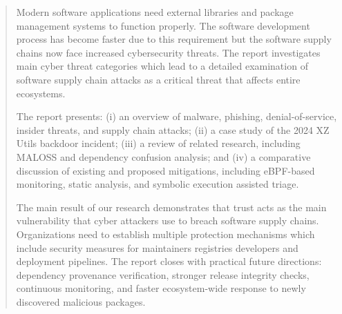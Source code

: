 \begin{abstract}
\addchaptertocentry{\abstractname}

Modern software applications need external libraries and package management systems to function properly. The software development process has become faster due to this requirement but the software supply chains now face increased cybersecurity threats. The report investigates main cyber threat categories which lead to a detailed examination of software supply chain attacks as a critical threat that affects entire ecosystems.

The report presents: (i) an overview of malware, phishing, denial-of-service, insider threats, and supply chain attacks; (ii) a case study of the 2024 XZ Utils backdoor incident; (iii) a review of related research, including MALOSS and dependency confusion analysis; and (iv) a comparative discussion of existing and proposed mitigations, including eBPF-based monitoring, static analysis, and symbolic execution assisted triage.

The main result of our research demonstrates that trust acts as the main vulnerability that cyber attackers use to breach software supply chains. Organizations need to establish multiple protection mechanisms which include security measures for maintainers registries developers and deployment pipelines. The report closes with practical future directions: dependency provenance verification, stronger release integrity checks, continuous monitoring, and faster ecosystem-wide response to newly discovered malicious packages.
\end{abstract}

\clearpage

